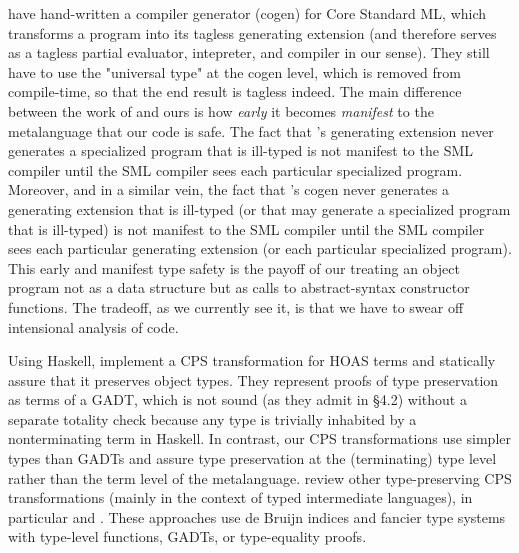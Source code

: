  have hand-written a compiler generator (cogen)
for Core Standard ML, which transforms a program into its tagless
generating extension (and therefore serves as a tagless partial
evaluator, intepreter, and compiler in our sense). They still have to
use the "universal type" at the cogen level, which is removed from
compile-time, so that the end result is tagless indeed.  The main
difference between the work of \citet{Birkedal-PE-ML} and ours is how
\emph{early} it becomes \emph{manifest} to the metalanguage
that our code is safe.  The fact that
\citet{Birkedal-PE-ML}'s generating extension never generates a
specialized program that is ill-typed is not manifest to the SML
compiler until the SML compiler sees each particular specialized
program.  Moreover, and in a similar vein, the fact that
\citet{Birkedal-PE-ML}'s cogen never generates a generating extension
that is ill-typed (or that may generate a specialized program that is
ill-typed) is not manifest to the SML compiler until the SML compiler
sees each particular generating extension (or each particular
specialized program).  This early and manifest type safety is the
payoff of our treating an object program not as a data structure but
as calls to abstract-syntax constructor functions.  The tradeoff, as
we currently see it, is that we have to swear off intensional analysis
of code. 


\ifshort\else
Using Haskell, \citet{Guillemette-Monier-PLPV} implement a CPS transformation
for HOAS terms and statically assure that it preserves object types.
They represent proofs of type preservation as terms of a GADT, which is not
sound (as they admit in \S4.2) without a separate totality check because
any type is trivially inhabited by a nonterminating term in Haskell.
In contrast, our CPS transformations use simpler types than GADTs and
assure type preservation at the (terminating) type level rather than
the term level of the metalanguage.
 review other
type\hyp preserving CPS transformations (mainly in the context of typed intermediate
languages), in particular
 and .
These approaches use de Bruijn indices and fancier
type systems with type-level functions, GADTs, or type\hyp equality
proofs.
\fi


